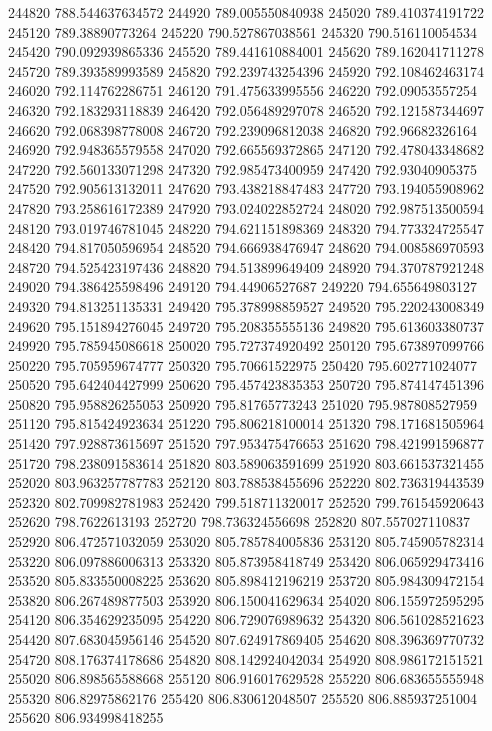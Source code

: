 {244820 788.544637634572
244920 789.005550840938
245020 789.410374191722
245120 789.38890773264
245220 790.527867038561
245320 790.516110054534
245420 790.092939865336
245520 789.441610884001
245620 789.162041711278
245720 789.393589993589
245820 792.239743254396
245920 792.108462463174
246020 792.114762286751
246120 791.475633995556
246220 792.09053557254
246320 792.183293118839
246420 792.056489297078
246520 792.121587344697
246620 792.068398778008
246720 792.239096812038
246820 792.96682326164
246920 792.948365579558
247020 792.665569372865
247120 792.478043348682
247220 792.560133071298
247320 792.985473400959
247420 792.93040905375
247520 792.905613132011
247620 793.438218847483
247720 793.194055908962
247820 793.258616172389
247920 793.024022852724
248020 792.987513500594
248120 793.019746781045
248220 794.621151898369
248320 794.773324725547
248420 794.817050596954
248520 794.666938476947
248620 794.008586970593
248720 794.525423197436
248820 794.513899649409
248920 794.370787921248
249020 794.386425598496
249120 794.44906527687
249220 794.655649803127
249320 794.813251135331
249420 795.378998859527
249520 795.220243008349
249620 795.151894276045
249720 795.208355555136
249820 795.613603380737
249920 795.785945086618
250020 795.727374920492
250120 795.673897099766
250220 795.705959674777
250320 795.70661522975
250420 795.602771024077
250520 795.642404427999
250620 795.457423835353
250720 795.874147451396
250820 795.958826255053
250920 795.81765773243
251020 795.987808527959
251120 795.815424923634
251220 795.806218100014
251320 798.171681505964
251420 797.928873615697
251520 797.953475476653
251620 798.421991596877
251720 798.238091583614
251820 803.589063591699
251920 803.661537321455
252020 803.963257787783
252120 803.788538455696
252220 802.736319443539
252320 802.709982781983
252420 799.518711320017
252520 799.761545920643
252620 798.7622613193
252720 798.736324556698
252820 807.557027110837
252920 806.472571032059
253020 805.785784005836
253120 805.745905782314
253220 806.097886006313
253320 805.873958418749
253420 806.065929473416
253520 805.833550008225
253620 805.898412196219
253720 805.984309472154
253820 806.267489877503
253920 806.150041629634
254020 806.155972595295
254120 806.354629235095
254220 806.729076989632
254320 806.561028521623
254420 807.683045956146
254520 807.624917869405
254620 808.396369770732
254720 808.176374178686
254820 808.142924042034
254920 808.986172151521
255020 806.898565588668
255120 806.916017629528
255220 806.683655555948
255320 806.82975862176
255420 806.830612048507
255520 806.885937251004
255620 806.934998418255
}
